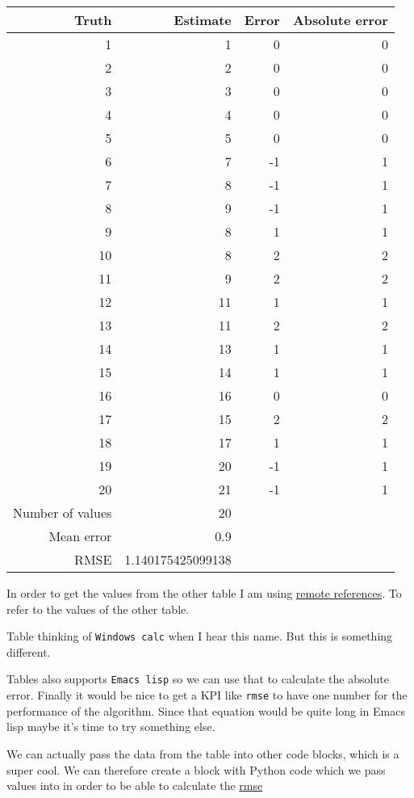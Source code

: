 \documentclass[11pt]{article}
\begin{document}
\begin{center}
\begin{tabular}{rrrr}
\hline
Truth & Estimate & Error & Absolute error\\
\hline
1 & 1 & 0 & 0\\
2 & 2 & 0 & 0\\
3 & 3 & 0 & 0\\
4 & 4 & 0 & 0\\
5 & 5 & 0 & 0\\
6 & 7 & -1 & 1\\
7 & 8 & -1 & 1\\
8 & 9 & -1 & 1\\
9 & 8 & 1 & 1\\
10 & 8 & 2 & 2\\
11 & 9 & 2 & 2\\
12 & 11 & 1 & 1\\
13 & 11 & 2 & 2\\
14 & 13 & 1 & 1\\
15 & 14 & 1 & 1\\
16 & 16 & 0 & 0\\
17 & 15 & 2 & 2\\
18 & 17 & 1 & 1\\
19 & 20 & -1 & 1\\
20 & 21 & -1 & 1\\
\hline
Number of values & 20 &  & \\
Mean error & 0.9 &  & \\
RMSE & 1.140175425099138 &  & \\
\hline
\end{tabular}

\end{center}

In order to get the values from the other table I am using \href{https://orgmode.org/manual/References.html\#index-remote-references-352}{remote references}. To
refer to the values of the other table.

Table
thinking of \texttt{Windows calc} when I hear this name. But this is something
different.

Tables also supports \texttt{Emacs lisp} so we can use that to calculate the absolute
error. Finally it would be nice to get a KPI like \texttt{rmse} to have one number for
the performance of the algorithm. Since that equation would be quite long in
Emacs lisp maybe it's time to try something else.

We can actually pass the data from the table into other code blocks, which is a
super cool. We can therefore create a block with Python code which we pass values
into in order to be able to calculate the \href{https://en.wikipedia.org/wiki/Root-mean-square\_deviation}{rmse}
\end{document}
